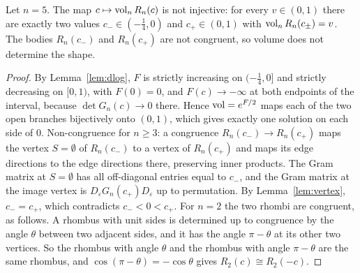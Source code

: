\begin{theorem}\label{thm:main}
Let $n=5$. The map $c\mapsto\operatorname{vol}_nR_n(c)$ is not injective: for every $v\in(0,1)$ there are exactly two values $c_-\in(- \frac{1}{4},0)$ and $c_+\in(0,1)$ with $\operatorname{vol}_nR_n(c_\pm)=v$.
The bodies $R_n(c_-)$ and $R_n(c_+)$ are not congruent, so volume does not determine the shape.
\end{theorem}
\begin{proof}
By Lemma~\ref{lem:dlog}, $F$ is strictly increasing on $(- \frac{1}{4},0]$ and strictly decreasing on $[0,1)$, with $F(0)=0$, and $F(c)\to-\infty$ at both endpoints of the interval, because $\det G_n(c)\to0$ there.
Hence $\operatorname{vol}=e^{F/2}$ maps each of the two open branches bijectively onto $(0,1)$, which gives exactly one solution on each side of $0$.
Non-congruence for $n\ge3$: a congruence $R_n(c_-)\to R_n(c_+)$ maps the vertex $S=\emptyset$ of $R_n(c_-)$ to a vertex of $R_n(c_+)$ and maps its edge directions to the edge directions there, preserving inner products. The Gram matrix at $S=\emptyset$ has all off-diagonal entries equal to $c_-$, and the Gram matrix at the image vertex is $D_\varepsilon G_n(c_+)D_\varepsilon$ up to permutation. By Lemma~\ref{lem:vertex}, $c_-=c_+$, which contradicts $c_-<0<c_+$. For $n=2$ the two rhombi are congruent, as follows. A rhombus with unit sides is determined up to congruence by the angle $\theta$ between two adjacent sides, and it has the angle $\pi-\theta$ at its other two vertices. So the rhombus with angle $\theta$ and the rhombus with angle $\pi-\theta$ are the same rhombus, and $\cos(\pi-\theta)=-\cos\theta$ gives $R_2(c)\cong R_2(-c)$.
\end{proof}
